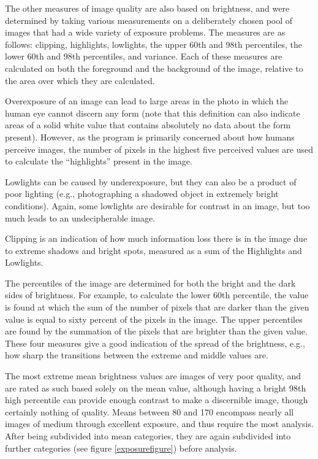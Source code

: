\documentclass{article}
\begin{document}
The other measures of image quality are also based on brightness, and were determined by taking various measurements on a deliberately chosen pool of images that had a wide variety of exposure problems. The measures are as follows: clipping, highlights, lowlights, the upper 60th and 98th percentiles, the lower 60th and 98th percentiles, and variance. Each of these measures are calculated on both the foreground and the background of the image, relative to the area over which they are calculated.

Overexposure of an image can lead to large areas in the photo in which the human eye cannot discern any form (note that this definition can also indicate areas of a solid white value that contains absolutely no data about the form present). However, as the program is primarily concerned about how humans perceive images, the number of pixels in the highest five perceived values are used to calculate the “highlights” present in the image.

Lowlights can be caused by underexposure, but they can also be a product of poor lighting (e.g., photographing a shadowed object in extremely bright conditions). Again, some lowlights are desirable for contrast in an image, but too much leads to an undecipherable image.

Clipping is an indication of how much information loss there is in the image due to extreme shadows and bright spots, measured as a sum of the Highlights and Lowlights.

The percentiles of the image are determined for both the bright and the dark sides of brightness. For example, to calculate the lower 60th percentile, the value is found at which the sum of the number of pixels that are darker than the given value is equal to sixty percent of the pixels in the image. The upper percentiles are found by the summation of the pixels that are brighter than the given value. These four measures give a good indication of the spread of the brightness, e.g., how sharp the transitions between the extreme and middle values are.

The most extreme mean brightness values are images of very poor quality, and are rated as such based solely on the mean value, although having a bright 98th high percentile can provide enough contrast to make a discernible image, though certainly nothing of quality. Means between 80 and 170 encompass nearly all images of medium through excellent exposure, and thus require the most analysis. After being subdivided into mean categories, they are again subdivided into further categories (see figure \ref{exposurefigure}) before analysis.
\end{document}
